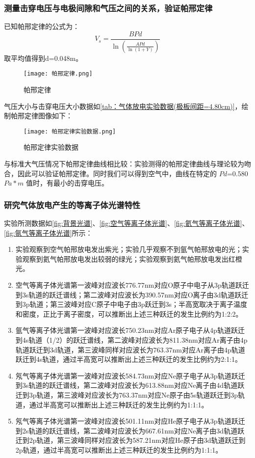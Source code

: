 \documentclass[dvipsnames, svgnames,a4paper,11pt]{article}
\begin{document}
	\subsubsection{测量击穿电压与电极间隙和气压之间的关系，验证帕邢定律}
	已知帕邢定律的公式为：
	\begin{equation}
	V_s = \frac{BPd}{\ln(\frac{APd}{\ln(1+Y)})}
	\label{eq:帕邢定律公式}
	\end{equation}
	取平均值得到d=0.048m。
	
	\begin{figure}[htbp]
		\centering
		\texttt{[image: 帕邢定律.png]}
		\caption{帕邢定律}
		\label{fig:帕邢定律}
	\end{figure}
	气压大小与击穿电压大小数据如\cref{tab：气体放电实验数据(极板间距=4.80cm)}，绘制帕邢定律图像如下：
	\begin{figure}[htbp]
		\centering
		\texttt{[image: 帕邢定律实验数据.png]}
		\caption{帕邢定律实验数据}
		\label{fig:帕邢定律实验数据}
	\end{figure}
	与标准大气压情况下帕邢定律曲线相比较：实验测得的帕邢定律曲线与理论较为吻合，因此可以验证帕邢定律。同时我们可以得到空气中，曲线在特定的 $Pd$=0.580$Pa*m$ 值时，有最小的击穿电压。 

	\subsubsection{研究气体放电产生的等离子体光谱特性 }
	实验所测数据如\cref{fig:背景光谱}、\cref{fig:空气等离子体光谱}、\cref{fig:氦气等离子体光谱}、\cref{fig:氩气等离子体光谱}所示：
	\begin{enumerate}
		\item 实验观察到空气帕邢放电发出紫光；实验几乎观察不到氩气帕邢放电的光；实验观察到氦气帕邢放电发出较弱的绿光；实验观察到氦气帕邢放电发出红橙光。
		\item 空气等离子体光谱第一波峰对应波长776.77nm对应O原子中电子从3p轨道跃迁到3s轨道的跃迁谱线；第二波峰对应波长为390.57nm对应O离子由3d轨道跃迁到3p轨道；第三波峰对应C原子中电子由3p跃迁到3s；半高宽取决于离子温度和密度，正比于离子密度，可以推断出上述三种跃迁的发生比例约为1:2:2。
		\item 氩气等离子体光谱第一波峰对应波长750.23nm对应Ar原子电子从4p轨道跃迁到4s轨道（1/2）的跃迁谱线，第二波峰对应波长为811.38nm对应Ar离子由4p轨道跃迁到3d轨道，第三波峰同样对应波长为763.37nm对应Ar离子由4p轨道跃迁到4s轨道，通过半高宽可以推断出上述三种跃迁的发生比例约为2:1:1。 
		\item 氖气等离子体光谱第一波峰对应波长584.73nm对应Ne原子电子从3p轨道跃迁到3s轨道的跃迁谱线，第二波峰对应波长为613.88nm对应Ne离子由4d轨道跃迁到3p轨道，第三波峰对应波长为763.37nm对应Ne原子由5s轨道跃迁到3p轨道，通过半高宽可以推断出上述三种跃迁的发生比例约为1:1:1。 
		\item 氖气等离子体光谱第一波峰对应波长501.11nm对应He原子电子从3p轨道跃迁到2s轨道的跃迁谱线，第二波峰对应波长为667.61nm对应Ne离子由3d轨道跃迁到2p轨道，第三波峰同样对应波长为587.21nm对应He原子由3d轨道跃迁到2p轨道，通过半高宽可以推断出上述三种跃迁的发生比例约为1:1:1。 
	\end{enumerate}
\end{document}
